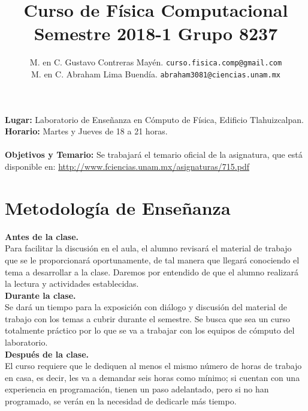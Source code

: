 \documentclass[12pt]{article}
\author{M. en C. Gustavo Contreras Mayén. \texttt{curso.fisica.comp@gmail.com}\\
M. en C. Abraham Lima Buendía. \texttt{abraham3081@ciencias.unam.mx}}
\title{Curso de Física Computacional\\{\large Semestre 2018-1 Grupo 8237}}
\date{ }
\begin{document}
\renewcommand\labelenumii{\theenumi.{\arabic{enumii}}}
\maketitle
\fontsize{12}{12}\selectfont
\textbf{Lugar: }Laboratorio de Enseñanza en Cómputo de Física, Edificio Tlahuizcalpan.
\\
\textbf{Horario: } Martes y Jueves de 18 a 21 horas.
\\
\\
\textbf{Objetivos y Temario:} Se trabajará el temario oficial de la asignatura, que está disponible en: \href{http://www.fciencias.unam.mx/asignaturas/715.pdf}{http://www.fciencias.unam.mx/asignaturas/715.pdf}
\section{Metodología de Enseñanza}
\textbf{Antes de la clase.}
\\
Para facilitar la discusión en el aula, el alumno revisará el material de trabajo que se le proporcionará oportunamente, de tal manera que llegará conociendo el tema a desarrollar a la clase. Daremos por entendido de que el alumno realizará la lectura y actividades establecidas.
\\
\textbf{Durante la clase.}
\\
Se dará un tiempo para la exposición con diálogo y discusión del material de trabajo con los temas a cubrir durante el semestre. Se busca que sea un curso totalmente práctico por lo que se va a trabajar con los equipos de cómputo del laboratorio.
\\
\textbf{Después de la clase.}
\\
El curso requiere que le dediquen al menos el mismo número de horas de trabajo en casa, es decir, les va a demandar seis horas como mínimo; si cuentan con una experiencia en programación, tienen un paso adelantado, pero si no han programado, se verán en la necesidad de dedicarle más tiempo.
\end{document}
